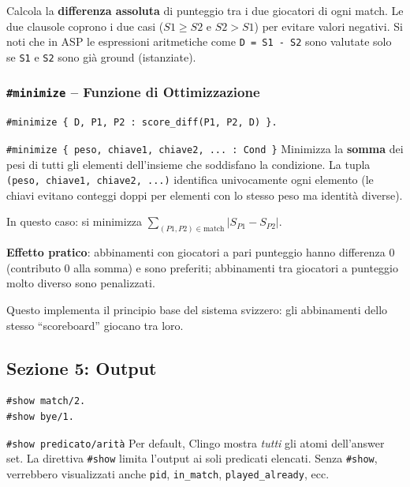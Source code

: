\documentclass[12pt,a4paper]{article}
\begin{document}
Calcola la \textbf{differenza assoluta} di punteggio tra i due giocatori di ogni
match. Le due clausole coprono i due casi ($S1 \ge S2$ e $S2 > S1$) per evitare
valori negativi. Si noti che in ASP le espressioni aritmetiche come
\texttt{D = S1 - S2} sono valutate solo se \texttt{S1} e \texttt{S2} sono
già ground (istanziate).

\subsubsection{\texttt{\#minimize} -- Funzione di Ottimizzazione}

\begin{lstlisting}
#minimize { D, P1, P2 : score_diff(P1, P2, D) }.
\end{lstlisting}

\begin{defbox}{\texttt{\#minimize \{ peso, chiave1, chiave2, ... : Cond \}}}
Minimizza la \textbf{somma} dei pesi di tutti gli elementi dell'insieme che
soddisfano la condizione. La tupla \texttt{(peso, chiave1, chiave2, ...)}
identifica univocamente ogni elemento (le chiavi evitano conteggi doppi per
elementi con lo stesso peso ma identità diverse).
\end{defbox}

In questo caso: si minimizza $\sum_{(P1,P2) \in \text{match}} |S_{P1} - S_{P2}|$.

\textbf{Effetto pratico}: abbinamenti con giocatori a pari punteggio
hanno differenza 0 (contributo 0 alla somma) e sono preferiti; abbinamenti
tra giocatori a punteggio molto diverso sono penalizzati.

Questo implementa il principio base del sistema svizzero: gli abbinamenti
dello stesso ``scoreboard'' giocano tra loro.

\subsection{Sezione 5: Output}

\begin{lstlisting}
#show match/2.
#show bye/1.
\end{lstlisting}

\begin{defbox}{\texttt{\#show predicato/arità}}
Per default, Clingo mostra \emph{tutti} gli atomi dell'answer set. La direttiva
\texttt{\#show} limita l'output ai soli predicati elencati. Senza \texttt{\#show},
verrebbero visualizzati anche \texttt{pid}, \texttt{in\_match},
\texttt{played\_already}, ecc.
\end{defbox}
\end{document}
